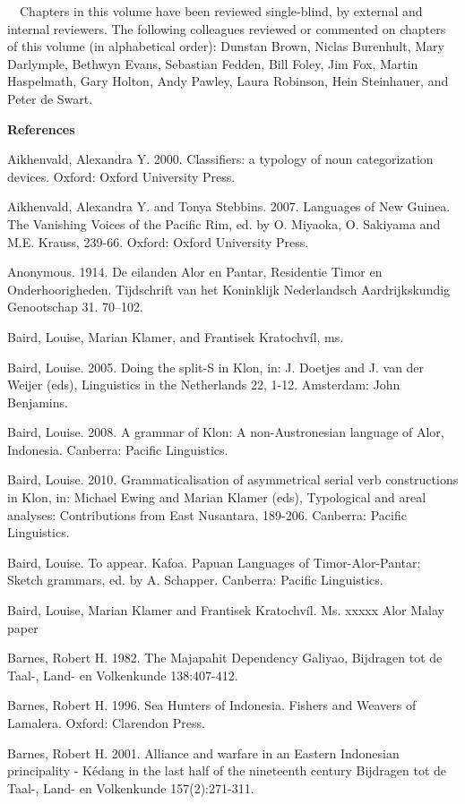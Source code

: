 \ \ Chapters in this volume have been reviewed single-blind, by external and internal reviewers. The following colleagues reviewed or commented on chapters of this volume (in alphabetical order): Dunstan Brown, Niclas Burenhult, Mary Darlymple, Bethwyn Evans, Sebastian Fedden, Bill Foley, Jim Fox, Martin Haspelmath, Gary Holton, Andy Pawley, Laura Robinson, Hein Steinhauer, and Peter de Swart.

{\bfseries
References}

Aikhenvald, Alexandra Y. 2000. Classifiers: a typology of noun categorization devices. Oxford: Oxford University Press. 

Aikhenvald, Alexandra Y. and Tonya Stebbins. 2007. Languages of New Guinea. The Vanishing Voices of the Pacific Rim, ed. by O. Miyaoka, O. Sakiyama and M.E. Krauss, 239-66. Oxford: Oxford University Press.

Anonymous. 1914. De eilanden Alor en Pantar, Residentie Timor en Onderhoorigheden. Tijdschrift van het Koninklijk Nederlandsch Aardrijkskundig Genootschap 31. 70--102.

Baird, Louise, Marian Klamer, and Frantisek Kratochv\'il, ms. 

Baird, Louise. 2005. Doing the split-S in Klon, in: J. Doetjes and J. van der Weijer (eds), Linguistics in the Netherlands 22, 1-12. Amsterdam: John Benjamins. 

Baird, Louise. 2008. A grammar of Klon: A non-Austronesian language of Alor, Indonesia. Canberra: Pacific Linguistics.

Baird, Louise. 2010. Grammaticalisation of asymmetrical serial verb constructions in Klon, in: Michael Ewing and Marian Klamer (eds), Typological and areal analyses: Contributions from East Nusantara, 189-206. Canberra: Pacific Linguistics.

Baird, Louise. To appear. Kafoa. Papuan Languages of Timor-Alor-Pantar: Sketch grammars, ed. by A. Schapper. Canberra: Pacific Linguistics.

Baird, Louise, Marian Klamer and Frantisek Kratochv\'il. Ms. xxxxx Alor Malay paper

Barnes, Robert H. 1982. The Majapahit Dependency Galiyao, Bijdragen tot de Taal-, Land- en Volkenkunde 138:407-412.

Barnes, Robert H. 1996. Sea Hunters of Indonesia. Fishers and Weavers of Lamalera. Oxford: Clarendon Press.

Barnes, Robert H. 2001. Alliance and warfare in an Eastern Indonesian principality - K\'edang in the last half of the nineteenth century Bijdragen tot de Taal-, Land- en Volkenkunde 157(2):271-311.

